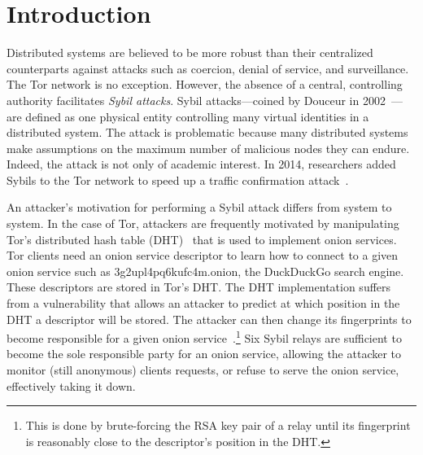 \section{Introduction}
\label{sec:introduction}

Distributed systems are believed to be more robust than their centralized
counterparts against attacks such as coercion, denial of service, and
surveillance.  The Tor network is no exception.  However, the absence of a
central, controlling authority facilitates \emph{Sybil attacks}.  Sybil
attacks---coined by Douceur in 2002~\cite{Douceur2002a}---are defined as one
physical entity controlling many virtual identities in a distributed system.
The attack is problematic because many distributed systems make assumptions on
the maximum number of malicious nodes they can endure.  Indeed, the attack is
not only of academic interest.  In 2014, researchers added Sybils to the Tor
network to speed up a traffic confirmation attack~\cite{cmucert}.

An attacker's motivation for performing a Sybil attack differs from system to
system.  In the case of Tor, attackers are frequently motivated by manipulating
Tor's distributed hash table (DHT)~\cite{rendspec} that is used to implement
onion services.  Tor clients need an onion service descriptor to learn how to
connect to a given onion service such as 3g2upl4pq6kufc4m.onion, the
DuckDuckGo search engine.  These descriptors are stored in Tor's DHT.  The DHT
implementation suffers from a vulnerability that allows an attacker to predict
at which position in the DHT a descriptor will be stored.  The attacker can then
change its fingerprints to become responsible for a given onion
service~\cite{Biryukov2013a}.\footnote{This is done by brute-forcing the RSA key
pair of a relay until its fingerprint is reasonably close to the descriptor's
position in the DHT.}  Six Sybil relays are sufficient to become the sole
responsible party for an onion service, allowing the attacker to monitor (still
anonymous) clients requests, or refuse to serve the onion service, effectively
taking it down.

